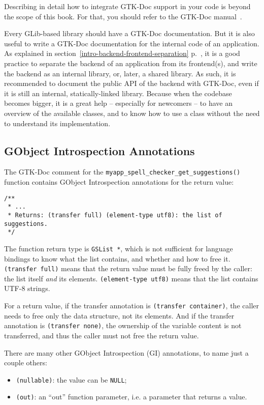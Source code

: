 Describing in detail how to integrate GTK-Doc support in your code is beyond the scope of this book. For that, you should refer to the GTK-Doc manual~\cite{gtk-doc}.

Every GLib-based library should have a GTK-Doc documentation. But it is also useful to write a GTK-Doc documentation for the internal code of an application. As explained in section~\ref{intro-backend-frontend-separation} p.~\pageref{intro-backend-frontend-separation}, it is a good practice to separate the backend of an application from its frontend(s), and write the backend as an internal library, or, later, a shared library. As such, it is recommended to document the public API of the backend with GTK-Doc, even if it is still an internal, statically-linked library. Because when the codebase becomes bigger, it is a great help -- especially for newcomers -- to have an overview of the available classes, and to know how to use a class without the need to understand its implementation.

\subsection{GObject Introspection Annotations}
The GTK-Doc comment for the \lstinline{myapp_spell_checker_get_suggestions()} function contains GObject Introspection annotations for the return value:
\begin{lstlisting}
/**
 * ...
 * Returns: (transfer full) (element-type utf8): the list of suggestions.
 */
\end{lstlisting}

The function return type is \lstinline{GSList *}, which is not sufficient for language bindings to know what the list contains, and whether and how to free it. \texttt{(transfer full)} means that the return value must be fully freed by the caller: the list itself \emph{and} its elements. \texttt{(element-type utf8)} means that the list contains UTF-8 strings.

For a return value, if the transfer annotation is \texttt{(transfer container)}, the caller needs to free only the data structure, not its elements. And if the transfer annotation is \texttt{(transfer none)}, the ownership of the variable content is not transferred, and thus the caller must not free the return value.

There are many other GObject Introspection (GI) annotations, to name just a couple others:
\begin{itemize}
  \item \texttt{(nullable)}: the value can be \lstinline{NULL};
  \item \texttt{(out)}: an ``out'' function parameter, i.e. a parameter that returns a value.
\end{itemize}

